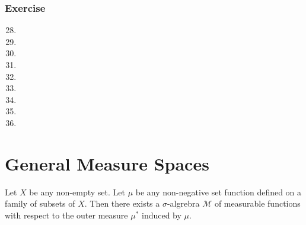 \subsubsection{Exercise}
\begin{enumerate}
	\setcounter{enumi}{27}
	\item
	\item
	\item
	\item
	\item
	\item
	\item
	\item
	\item
\end{enumerate}


\setcounter{section}{16}
\section{General Measure Spaces}
	Let $X$ be any non-empty set.
	Let $\mu$ be any non-negative set function defined on a family of subsets of $X$.
	Then there exists a $\sigma$-algrebra $\mathcal{M}$ of measurable functions with respect to the outer measure $\mu^\ast$ induced by $\mu$.
